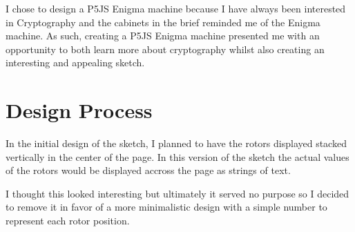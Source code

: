 \documentclass[12pt,a4paper]{article}
\begin{document}
		I chose to design a P5JS Enigma machine because I have always been interested 
		in Cryptography and the cabinets in the brief reminded me of the Enigma machine. 
		As such, creating a P5JS Enigma machine presented me with an opportunity to 
		both learn more about cryptography whilst also creating an interesting and appealing 
		sketch.\\

	\section{Design Process}
		In the initial design of the sketch, I planned to have the rotors displayed stacked 
		vertically in the center of the page. In this version of the sketch the actual values 
		of the rotors would be displayed accross the page as strings of text. 
		
		\begin{center}
			\par
		\end{center}

		I thought this looked interesting but ultimately it served no purpose so I decided to 
		remove it in favor of a more minimalistic design with a simple number to represent 
		each rotor position.\\
\end{document}
